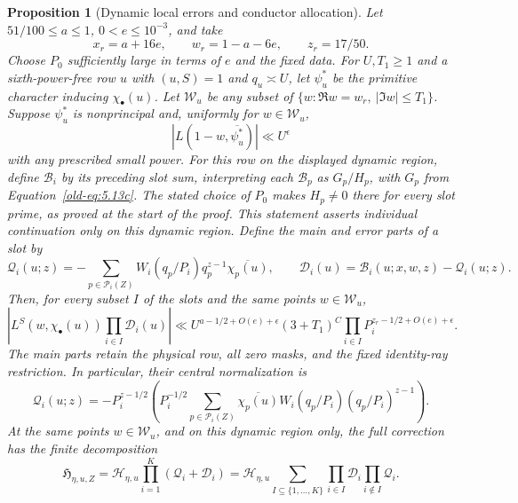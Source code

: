 \documentclass[11pt,a4paper]{article}
\numberwithin{equation}{section}
\numberwithin{figure}{section}
\newtheorem{proposition}[theorem]{Proposition}
\theoremstyle{definition}
\theoremstyle{remark}
\begin{document}
\begin{proposition}[Dynamic local errors and conductor allocation]
\label{prop:probe-errors}
Let $51/100\le a\le1$, $0<e\le10^{-3}$, and take
\[
 x_r=a+16e,\qquad w_r=1-a-6e,\qquad z_r=17/50.
\]
Choose $P_0$ sufficiently large in terms of $e$ and the fixed data.
For $U,T_1\ge1$ and a sixth-power-free row $u$ with $(u,S)=1$
and $q_u\asymp U$, let $\psi_u^*$
be the primitive character inducing $\chi_\bullet(u)$.  Let
$\mathcal W_u$ be any subset of
$\{w:\Re w=w_r,\ |\Im w|\le T_1\}$.  Suppose $\psi_u^*$ is
nonprincipal and, uniformly for $w\in\mathcal W_u$,
\[
 |L(1-w,\overline{\psi_u^*})|\ll U^\epsilon
\]
with any prescribed small power.
For this row on the displayed dynamic region, define \(\mathcal B_i\) by
its preceding slot sum, interpreting each \(\mathcal B_p\) as \(G_p/H_p\),
with \(G_p\) from Equation~\eqref{old-eq:5.13c}.  The stated choice of
\(P_0\) makes \(H_p\ne0\) there for every slot prime, as proved at the start
of the proof.  This statement asserts individual continuation only on this
dynamic region.
Define the main and error parts of a slot by
\[
 \mathcal Q_i(u;z)=
       -\sum_{p\in\mathcal P_i(Z)}W_i(q_p/P_i)q_p^{z-1}\overline{\chi_p(u)},
 \qquad
 \mathcal D_i(u)=\mathcal B_i(u;x,w,z)-\mathcal Q_i(u;z).
\]
Then, for every subset $I$ of the slots and the same points $w\in\mathcal W_u$,
\begin{equation}\label{old-eq:5.13e}
 \left|L^S(w,\chi_\bullet(u))\prod_{i\in I}\mathcal D_i(u)\right|
 \ll U^{a-1/2+O(e)+\epsilon}(3+T_1)^C
       \prod_{i\in I}P_i^{z_r-1/2+O(e)+\epsilon}.
\end{equation}
The main parts retain the physical row, all zero masks, and the
fixed identity-ray restriction.  In particular, their central
normalization is
\[
 \mathcal Q_i(u;z)=-P_i^{z-1/2}
       \left(P_i^{-1/2}\sum_{p\in\mathcal P_i(Z)}
          \overline{\chi_p(u)}W_i(q_p/P_i)(q_p/P_i)^{z-1}\right).
\]
At the same points $w\in\mathcal W_u$, and on this dynamic region only, the
full correction has the finite decomposition
\begin{equation}\label{eq:dynamic-compensated-decomposition}
 \mathfrak H_{\eta,u,Z}
 =\mathcal H_{\eta,u}\prod_{i=1}^K(\mathcal Q_i+\mathcal D_i)
 =\mathcal H_{\eta,u}
   \sum_{I\subseteq\{1,\ldots,K\}}
       \prod_{i\in I}\mathcal D_i\prod_{i\notin I}\mathcal Q_i.
\end{equation}
\end{proposition}
\end{document}
